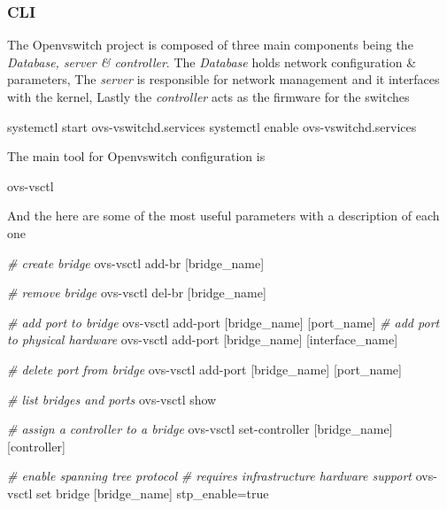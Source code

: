 \documentclass[
  14pt,
  english,
  a4paper,
]{scrreprt}
\newenvironment{Shaded}{}{}
\newcommand{\CommentTok}[1]{\textcolor[rgb]{0.38,0.63,0.69}{\textit{#1}}}
\newcommand{\ExtensionTok}[1]{#1}
\newcommand{\NormalTok}[1]{#1}
\begin{document}
\hypertarget{cli-4}{%
\subsubsection{CLI}\label{cli-4}}

The Openvswitch project is composed of three main components being the
\emph{Database, server \& controller}. The \emph{Database} holds network
configuration \& parameters, The \emph{server} is responsible for
network management and it interfaces with the kernel, Lastly the
\emph{controller} acts as the firmware for the switches

\begin{Shaded}
\begin{Highlighting}[]
\ExtensionTok{systemctl}\NormalTok{ start ovs{-}vswitchd.services}
\ExtensionTok{systemctl}\NormalTok{ enable ovs{-}vswitchd.services}
\end{Highlighting}
\end{Shaded}

The main tool for Openvswitch configuration is

\begin{Shaded}
\begin{Highlighting}[]
\ExtensionTok{ovs{-}vsctl}
\end{Highlighting}
\end{Shaded}

And the here are some of the most useful parameters with a description
of each one

\begin{Shaded}
\begin{Highlighting}[]
\CommentTok{\# create bridge}
\ExtensionTok{ovs{-}vsctl}\NormalTok{ add{-}br [bridge\_name]}

\CommentTok{\# remove bridge}
\ExtensionTok{ovs{-}vsctl}\NormalTok{ del{-}br [bridge\_name]}

\CommentTok{\# add port to bridge}
\ExtensionTok{ovs{-}vsctl}\NormalTok{ add{-}port [bridge\_name] [port\_name]}
\CommentTok{\# add port to physical hardware}
\ExtensionTok{ovs{-}vsctl}\NormalTok{ add{-}port [bridge\_name] [interface\_name]}

\CommentTok{\# delete port from bridge}
\ExtensionTok{ovs{-}vsctl}\NormalTok{ add{-}port [bridge\_name] [port\_name]}

\CommentTok{\# list bridges and ports}
\ExtensionTok{ovs{-}vsctl}\NormalTok{ show}

\CommentTok{\# assign a controller to a bridge}
\ExtensionTok{ovs{-}vsctl}\NormalTok{ set{-}controller [bridge\_name] [controller]}

\CommentTok{\# enable spanning tree protocol}
\CommentTok{\# requires infrastructure hardware support}
\ExtensionTok{ovs{-}vsctl}\NormalTok{ set bridge [bridge\_name] stp\_enable=true}
\end{Highlighting}
\end{Shaded}
\end{document}
